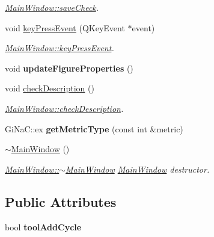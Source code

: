 \begin{DoxyCompactItemize}
\begin{DoxyCompactList}\small\item\em \mbox{\hyperlink{class_main_window_ae2defb68c51e884b7031693b20bdd556}{Main\+Window\+::save\+Check}}. \end{DoxyCompactList}\item 
void \mbox{\hyperlink{class_main_window_a9c4f542263838b9ecd06eae839a42a34}{key\+Press\+Event}} (Q\+Key\+Event $\ast$event)
\begin{DoxyCompactList}\small\item\em \mbox{\hyperlink{class_main_window_a9c4f542263838b9ecd06eae839a42a34}{Main\+Window\+::key\+Press\+Event}}. \end{DoxyCompactList}\item 
\mbox{\label{class_main_window_af99d72b486f296b0cd86f2f9021a6343}} 
void {\bfseries update\+Figure\+Properties} ()
\item 
void \mbox{\hyperlink{class_main_window_a3e72a214988b3628c36ad4f3e41dc0af}{check\+Description}} ()
\begin{DoxyCompactList}\small\item\em \mbox{\hyperlink{class_main_window_a3e72a214988b3628c36ad4f3e41dc0af}{Main\+Window\+::check\+Description}}. \end{DoxyCompactList}\item 
\mbox{\label{class_main_window_afa9a4efe6ebf3ab77ec807346d792732}} 
Gi\+Na\+C\+::ex {\bfseries get\+Metric\+Type} (const int \&metric)
\item 
\mbox{\label{class_main_window_ae98d00a93bc118200eeef9f9bba1dba7}} 
\mbox{\hyperlink{class_main_window_ae98d00a93bc118200eeef9f9bba1dba7}{$\sim$\+Main\+Window}} ()
\begin{DoxyCompactList}\small\item\em \mbox{\hyperlink{class_main_window_ae98d00a93bc118200eeef9f9bba1dba7}{Main\+Window\+::$\sim$\+Main\+Window}} \mbox{\hyperlink{class_main_window}{Main\+Window}} destructor. \end{DoxyCompactList}\end{DoxyCompactItemize}
\subsection*{Public Attributes}
\begin{DoxyCompactItemize}
\item 
\mbox{\label{class_main_window_ada1631bee647fb176facf5077da7f91c}} 
bool {\bfseries tool\+Add\+Cycle}
\end{DoxyCompactItemize}


